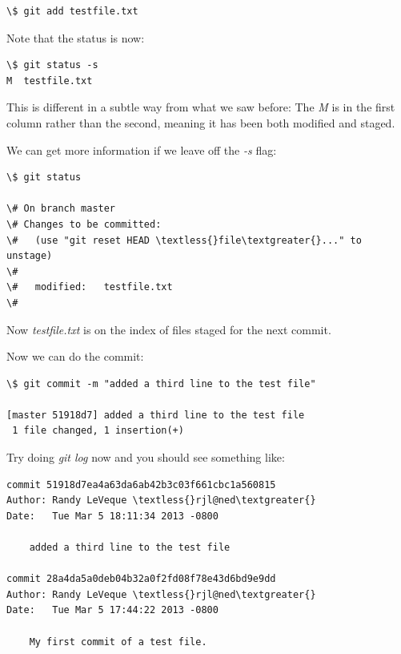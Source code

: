 \documentclass[letterpaper,10pt,english]{sphinxmanual}
\begin{document}
\begin{enumerate}
\begin{Verbatim}[commandchars=\\\{\}]
\$ git add testfile.txt
\end{Verbatim}

Note that the status is now:

\begin{Verbatim}[commandchars=\\\{\}]
\$ git status -s
M  testfile.txt
\end{Verbatim}

This is different in a subtle way from what we saw before: The \emph{M} is
in the first column rather than the second, meaning it has been both
modified and staged.

We can get more information if we leave off the \emph{-s} flag:

\begin{Verbatim}[commandchars=\\\{\}]
\$ git status

\# On branch master
\# Changes to be committed:
\#   (use "git reset HEAD \textless{}file\textgreater{}..." to unstage)
\#
\#   modified:   testfile.txt
\#
\end{Verbatim}

Now \emph{testfile.txt} is on the index of files staged for the next commit.

Now we can do the commit:

\begin{Verbatim}[commandchars=\\\{\}]
\$ git commit -m "added a third line to the test file"

[master 51918d7] added a third line to the test file
 1 file changed, 1 insertion(+)
\end{Verbatim}

Try doing \emph{git log} now and you should see something like:

\begin{Verbatim}[commandchars=\\\{\}]
commit 51918d7ea4a63da6ab42b3c03f661cbc1a560815
Author: Randy LeVeque \textless{}rjl@ned\textgreater{}
Date:   Tue Mar 5 18:11:34 2013 -0800

    added a third line to the test file

commit 28a4da5a0deb04b32a0f2fd08f78e43d6bd9e9dd
Author: Randy LeVeque \textless{}rjl@ned\textgreater{}
Date:   Tue Mar 5 17:44:22 2013 -0800

    My first commit of a test file.
\end{Verbatim}


\end{enumerate}
\end{document}
